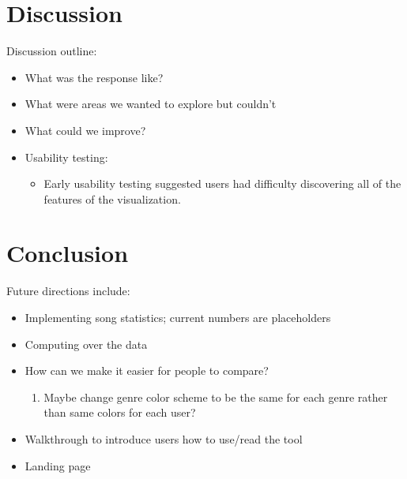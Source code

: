 \documentclass[journal]{vgtc}                %
\begin{document}
\section{Discussion}

Discussion outline:
\begin{itemize}
  \item What was the response like?
  \item What were areas we wanted to explore but couldn't
  \item What could we improve?
  \item Usability testing:
  \begin{itemize}
    \item Early usability testing suggested users had difficulty discovering all of the features of the visualization.
  \end{itemize}
\end{itemize}

\section{Conclusion}

Future directions include:
\begin{itemize}
  \item Implementing song statistics; current numbers are placeholders
  \item Computing over the data
  \item How can we make it easier for people to compare?
  \begin{enumerate}
    \item Maybe change genre color scheme to be the same for each genre rather than same colors for each user?
  \end{enumerate}
  \item Walkthrough to introduce users how to use/read the tool
  \item Landing page
\end{itemize}


%

%
%
%


\end{document}
